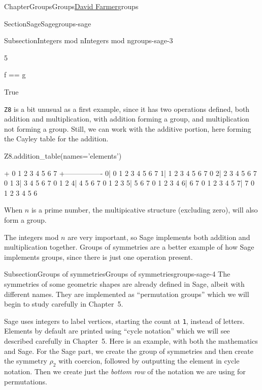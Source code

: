 \documentclass[oneside,10pt,]{book}
\newcommand{\mono}[1]{\texttt{#1}}
\numberwithin{equation}{section}
\begin{document}
\begin{chapterptx}{Chapter}{Groups}{}{Groups}{\hyperlink{dfarmer}{David Farmer}}{}{groups}
\begin{sectionptx}{Section}{Sage}{}{Sage}{}{}{groups-sage}
\begin{subsectionptx}{Subsection}{Integers mod n}{}{Integers mod n}{}{}{groups-sage-3}
\begin{sageinput}
\end{sageinput}
\begin{sageoutput}
5
\end{sageoutput}
\begin{sageinput}
f == g
\end{sageinput}
\begin{sageoutput}
True
\end{sageoutput}
\mono{Z8} is a bit unusual as a first example, since it has two operations defined, both addition and multiplication, with addition forming a group, and multiplication not forming a group.  Still, we can work with the additive portion, here forming the Cayley table for the addition.%
\begin{sageinput}
Z8.addition_table(names='elements')
\end{sageinput}
\begin{sageoutput}
+  0 1 2 3 4 5 6 7
 +----------------
0| 0 1 2 3 4 5 6 7
1| 1 2 3 4 5 6 7 0
2| 2 3 4 5 6 7 0 1
3| 3 4 5 6 7 0 1 2
4| 4 5 6 7 0 1 2 3
5| 5 6 7 0 1 2 3 4
6| 6 7 0 1 2 3 4 5
7| 7 0 1 2 3 4 5 6
\end{sageoutput}
When \(n\) is a prime number, the multipicative structure (excluding zero), will also form a group.%
\par
The integers mod \(n\) are very important, so Sage implements both addition and multiplication together.  Groups of symmetries are a better example of how Sage implements groups, since there is just one operation present.%
\end{subsectionptx}
%
%
\typeout{************************************************}
\typeout{************************************************}
%
\begin{subsectionptx}{Subsection}{Groups of symmetries}{}{Groups of symmetries}{}{}{groups-sage-4}
The symmetries of some geometric shapes are already defined in Sage, albeit with different names.  They are implemented as ``permutation groups'' which we will begin to study carefully in Chapter~5.%
\par
Sage uses integers to label vertices, starting the count at \mono{1}, instead of letters.  Elements by default are printed using ``cycle notation'' which we will see described carefully in Chapter~5.    Here is an example, with both the mathematics and Sage.  For the Sage part, we create the group of symmetries and then create the symmetry \(\rho_2\) with coercion, followed by outputting the element in cycle notation.  Then we create just the \emph{bottom row} of the notation we are using for permutations.%

\end{subsectionptx}
\end{sectionptx}
\end{chapterptx}
\end{document}
